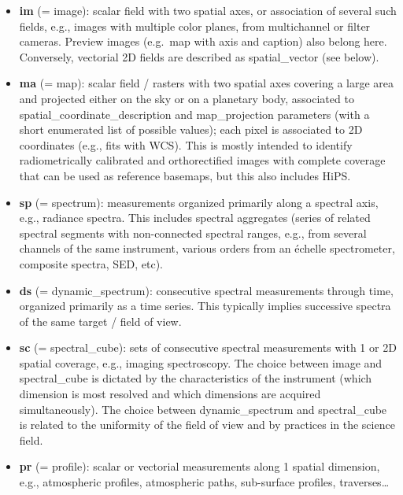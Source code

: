 \documentclass[11pt,a4paper]{ivoa}
\begin{document}
\begin{itemize}

\item \textbf{im }(= image): scalar field with two spatial axes, or
association of several such fields, e.g., images with multiple color
planes, from multichannel or filter cameras. Preview images (e.g.\ map
with axis and caption) also belong here. Conversely, vectorial 2D fields
are described as spatial\_vector (see below).

\item \textbf{ma }(= map): scalar field / rasters with two spatial axes
covering a large area and projected either on the sky or on a planetary
body, associated to spatial\_coordinate\_description and map\_projection
parameters (with a short enumerated list of possible values); each pixel
is associated to 2D coordinates (e.g., fits with WCS). This is mostly
intended to identify radiometrically calibrated and orthorectified
images with complete coverage that can be used as reference basemaps,
but this also includes HiPS.

\item \textbf{sp }(= spectrum): measurements organized primarily along a
spectral axis, e.g., radiance spectra. This includes spectral aggregates
(series of related spectral segments with non-connected spectral ranges,
e.g., from several channels of the same instrument, various orders from
an échelle spectrometer, composite spectra, SED, etc).

\item \textbf{ds }(= dynamic\_spectrum): consecutive spectral measurements
through time, organized primarily as a time series. This typically
implies successive spectra of the same target / field of view.

\item \textbf{sc }(= spectral\_cube): sets of consecutive
spectral measurements with 1 or 2D spatial coverage, e.g., imaging
spectroscopy. The choice between image and spectral\_cube is dictated by
the characteristics of the instrument (which dimension is most resolved
and which dimensions are acquired simultaneously). The choice between
dynamic\_spectrum and spectral\_cube is related to the uniformity of
the field of view and by practices in the science field.

\item \textbf{pr }(= profile): scalar or vectorial measurements along
1 spatial dimension, e.g., atmospheric profiles, atmospheric paths,
sub-surface profiles, traverses…


\end{itemize}
\end{document}
